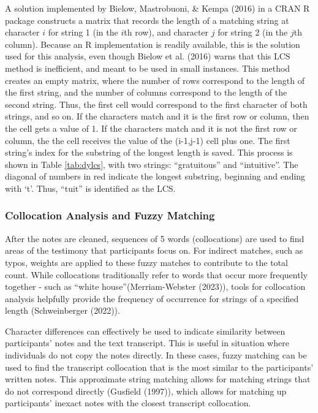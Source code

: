 \documentclass[print]{nuthesis}
\begin{document}
A solution implemented by Bielow, Mastrobuoni, \& Kempa (2016) in a CRAN R package constructs a matrix that records the length of a matching string at character \(i\) for string 1 (in the \(i\)th row), and character \(j\) for string 2 (in the \(j\)th column).
Because an R implementation is readily available, this is the solution used for this analysis, even though Bielow et al. (2016) warns that this LCS method is inefficient, and meant to be used in small instances.
This method creates an empty matrix, where the number of rows correspond to the length of the first string, and the number of columns correspond to the length of the second string.
Thus, the first cell would correspond to the first character of both strings, and so on.
If the characters match and it is the first row or column, then the cell gets a value of 1.
If the characters match and it is not the first row or column, the the cell receives the value of the (i-1,j-1) cell plus one.
The first string's index for the substring of the longest length is saved.
This process is shown in Table \ref{tab:dylcs}, with two strings: ``gratuitous'' and ``intuitive''.
The diagonal of numbers in red indicate the longest substring, beginning and ending with `t'.
Thus, ``tuit'' is identified as the LCS.

\hypertarget{collocation-analysis-and-fuzzy-matching}{%
\subsubsection{Collocation Analysis and Fuzzy Matching}\label{collocation-analysis-and-fuzzy-matching}}

After the notes are cleaned, sequences of 5 words (collocations) are used to find areas of the testimony that participants focus on.
For indirect matches, such as typos, weights are applied to these fuzzy matches to contribute to the total count.
While collocations traditionally refer to words that occur more frequently together - such as ``white house''(Merriam-Webster (2023)), tools for collocation analysis helpfully provide the frequency of occurrence for strings of a specified length (Schweinberger (2022)).

Character differences can effectively be used to indicate similarity between participants' notes and the text transcript.
This is useful in situation where individuals do not copy the notes directly.
In these cases, fuzzy matching can be used to find the transcript collocation that is the most similar to the participants' written notes.
This approximate string matching allows for matching strings that do not correspond directly (Gusfield (1997)), which allows for matching up participants' inexact notes with the closest transcript collocation.
\end{document}
